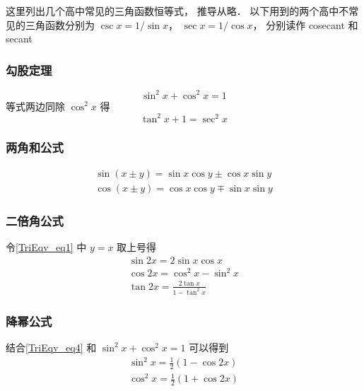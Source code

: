 

这里列出几个高中常见的三角函数恒等式， 推导从略． 以下用到的两个高中不常见的三角函数分别为 $\csc x= 1/\sin x$， $\sec x = 1/\cos x$， 分别读作 cosecant 和 secant

\subsubsection{勾股定理}

\begin{equation}
\sin^2 x + \cos^2 x = 1
\end{equation}
等式两边同除 $\cos^2 x$ 得
\begin{equation}\label{TriEqv_eq13}
\tan^2 x + 1 = \sec^2 x
\end{equation}

\subsubsection{两角和公式}
\begin{gather}\label{TriEqv_eq1}
\sin(x\pm y) = \sin x\cos y \pm \cos x\sin y\\
\label{TriEqv_eq2}
\cos(x\pm y) = \cos x\cos y \mp \sin x\sin y
\end{gather}

\subsubsection{二倍角公式}

令\autoref{TriEqv_eq1} 中 $y=x$ 取上号得
\begin{gather}
\sin 2x = 2\sin x\cos x\\
\label{TriEqv_eq4}
\cos 2x = \cos^2 x - \sin^2 x\\
\tan 2x = \frac{2\tan x}{1 - \tan^2 x}
\end{gather}

\subsubsection{降幂公式}

结合\autoref{TriEqv_eq4} 和 $\sin^2 x + \cos^2 x = 1$ 可以得到
\begin{gather}
\sin^2 x = \frac12 (1- \cos 2x) \label{TriEqv_eq5} \\
\cos^2 x = \frac12 (1+\cos 2x) \label{TriEqv_eq6}
\end{gather}

